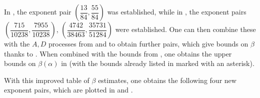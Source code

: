 \documentclass[a4paper, 10pt]{amsart}
\begin{document}
In \cite{bourgain_decoupling_2017}, the exponent pair $\left(\dfrac{13}{84}, \dfrac{55}{84}\right)$ was established, while in
\cite[Lemma 1.1]{trudgian-yang}, the exponent pairs $\left(\dfrac{715}{10238}, \dfrac{7955}{10238}\right)$, $\left(\dfrac{4742}{38463}, \dfrac{35731}{51284}\right)$ were established.
One can then combine these with the $A,D$ processes from  and  to obtain further pairs, which give bounds on $\beta$ thanks to .  When combined with the bounds from \cite[Table 3]{trudgian-yang}, one obtains the upper bounds on $\beta(\alpha)$ in  (with the bounds already listed in \cite[Table 3]{trudgian-yang} marked with an asterisk).

With this improved table of $\beta$ estimates, one obtains the following four new exponent pairs, which are plotted in  and .
\end{document}
